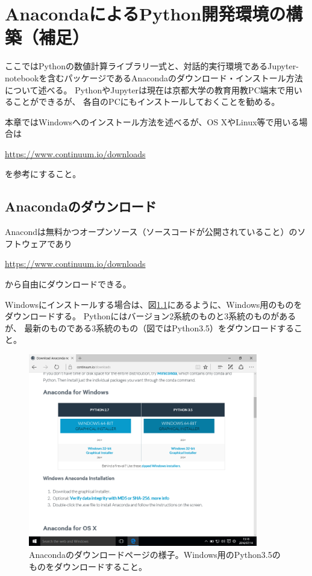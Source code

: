 \chapter{AnacondaによるPython開発環境の構築（補足）\label{chap:anaconda}}
ここではPythonの数値計算ライブラリ一式と、対話的実行環境であるJupyter-notebookを含むパッケージであるAnacondaのダウンロード・インストール方法について述べる。
PythonやJupyterは現在は京都大学の教育用教PC端末で用いることができるが、
各自のPCにもインストールしておくことを勧める。

本章ではWindowsへのインストール方法を述べるが、OS XやLinux等で用いる場合は

\url{https://www.continuum.io/downloads}

\noindent を参考にすること。

\section{Anacondaのダウンロード}
Anacondは無料かつオープンソース（ソースコードが公開されていること）のソフトウェアであり

\url{https://www.continuum.io/downloads}

\noindent から自由にダウンロードできる。

Windowsにインストールする場合は、図\ref{fig:Anaconda_download}にあるように、Windows用のものをダウンロードする。
Pythonにはバージョン2系統のものと3系統のものがあるが、
最新のものである3系統のもの（図ではPython3.5）をダウンロードすること。


\begin{figure}
	\centering
	\includegraphics[width=10cm]{TeX_files/fig_python_install/Anaconda_download.png}
	\caption{
		\label{fig:Anaconda_download}
		Anacondaのダウンロードページの様子。Windows用のPython3.5のものをダウンロードすること。
	}
\end{figure}


